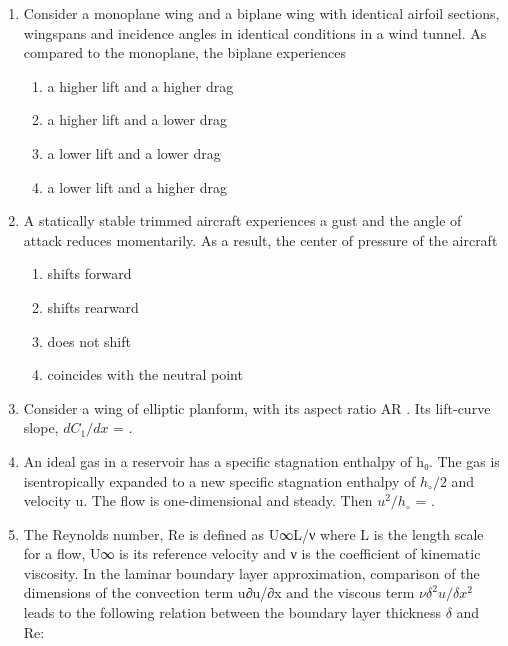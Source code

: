 \documentclass{article}
\begin{document}
\begin{enumerate}
\item Consider a monoplane wing and a biplane wing with identical airfoil sections, wingspans and incidence angles in identical conditions in a wind tunnel. As compared to the monoplane, the biplane experiences
\begin{enumerate}
\item a higher lift and a higher drag
\item a higher lift and a lower drag
\item a lower lift and a lower drag
\item a lower lift and a higher drag
\end{enumerate}

\item A statically stable trimmed aircraft experiences a gust and the angle of attack reduces momentarily. As a result, the center of pressure of the aircraft

\begin{multicols}{4}
\begin{enumerate}
\item shifts forward
\item shifts rearward
\item does not shift
\item coincides with the neutral point
\end{enumerate}
\end{multicols}

\item Consider a wing of elliptic planform, with its aspect ratio AR \longrightarrow \infty. Its lift-curve slope, $dC_1/dx$ = \underline{\hspace{2cm}}.


\item An ideal gas in a reservoir has a specific stagnation enthalpy of h₀. The gas is isentropically expanded to a new specific stagnation enthalpy of $h_\circ/2$ and velocity u. The flow is one-dimensional and steady. Then $u^2/h_\circ$ = \underline{\hspace{2cm}}.


\item The Reynolds number, Re is defined as U∞L/ν where L is the length scale for a flow, U∞ is its reference velocity and ν is the coefficient of kinematic viscosity. In the laminar boundary layer approximation, comparison of the dimensions of the convection term u∂u/∂x and the viscous term $ν\delta^2u/\delta x^2$ leads to the following relation between the boundary layer thickness $\delta$ and Re:


\end{enumerate}
\end{document}

